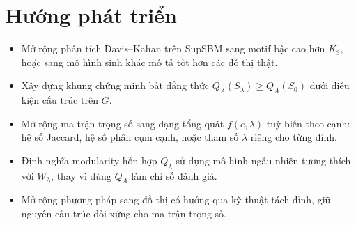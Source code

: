 \section*{Hướng phát triển}

\begin{itemize}
    \item Mở rộng phân tích Davis--Kahan trên SupSBM sang motif bậc cao hơn $K_3$, hoặc sang mô hình sinh khác mô tả tốt hơn các đồ thị thật.
    \item Xây dựng khung chứng minh bất đẳng thức $Q_A(S_\lambda) \geq Q_A(S_0)$ dưới điều kiện cấu trúc trên $G$.
    \item Mở rộng ma trận trọng số sang dạng tổng quát $f(e, \lambda)$ tuỳ biến theo cạnh: hệ số Jaccard, hệ số phân cụm cạnh, hoặc tham số $\lambda$ riêng cho từng đỉnh.
    \item Định nghĩa modularity hỗn hợp $Q_\lambda$ sử dụng mô hình ngẫu nhiên tương thích với $W_\lambda$, thay vì dùng $Q_A$ làm chỉ số đánh giá.
    \item Mở rộng phương pháp sang đồ thị có hướng qua kỹ thuật tách đỉnh, giữ nguyên cấu trúc đối xứng cho ma trận trọng số.
\end{itemize}

\cleardoublepage
